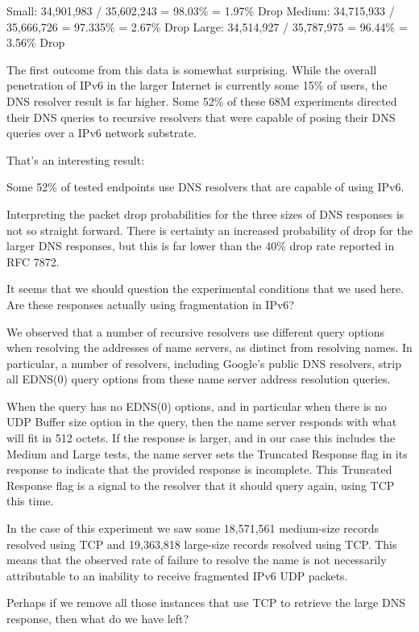 Small:  34,901,983 / 35,602,243 = 98.03\% = 1.97\% Drop 
Medium: 34,715,933 / 35,666,726 = 97.335\% = 2.67\% Drop 
Large:  34,514,927 / 35,787,975 = 96.44\% = 3.56\% Drop 

The first outcome from this data is somewhat surprising. While the overall penetration of IPv6 in the larger Internet is currently some 15\% of users, the DNS resolver result is far higher. Some 52\% of these 68M experiments directed their DNS queries to recursive resolvers that were capable of posing their DNS queries over a IPv6 network substrate.

That's an interesting result:

Some 52\% of tested endpoints use DNS resolvers that are capable of using IPv6.

Interpreting the packet drop probabilities for the three sizes of DNS responses is not so straight forward. There is certainty an increased probability of drop for the larger DNS responses, but this is far lower than the 40\% drop rate reported in RFC 7872.

It seems that we should question the experimental conditions that we used here. Are these responses actually using fragmentation in IPv6?

We observed that a number of recursive resolvers use different query options when resolving the addresses of name servers, as distinct from resolving names. In particular, a number of resolvers, including Google’s public DNS resolvers, strip all EDNS(0) query options from these name server address resolution queries.

When the query has no EDNS(0) options, and in particular when there is no UDP Buffer size option in the query, then the name server responds with what will fit in 512 octets. If the response is larger, and in our case this includes the Medium and Large tests, the name server sets the Truncated Response flag in its response to indicate that the provided response is incomplete. This Truncated Response flag is a signal to the resolver that it should query again, using TCP this time.

In the case of this experiment we saw some 18,571,561 medium-size records resolved using TCP and 19,363,818 large-size records resolved using TCP. This means that the observed rate of failure to resolve the name is not necessarily attributable to an inability to receive fragmented IPv6 UDP packets.

Perhaps if we remove all those instances that use TCP to retrieve the large DNS response, then what do we have left?

